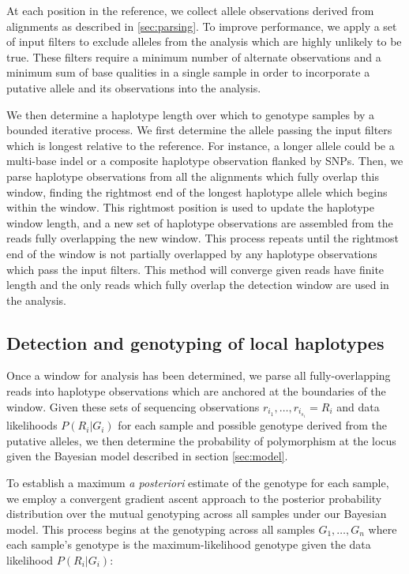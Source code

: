 \documentclass{article}
\begin{document}
At each position in the reference, we collect allele observations derived from alignments as described in \ref{sec:parsing}.  To improve performance, we apply a set of input filters to exclude alleles from the analysis which are highly unlikely to be true.  These filters require a minimum number of alternate observations and a minimum sum of base qualities in a single sample in order to incorporate a putative allele and its observations into the analysis.

We then determine a haplotype length over which to genotype samples by a bounded iterative process.  We first determine the allele passing the input filters which is longest relative to the reference.  For instance, a longer allele could be a multi-base indel or a composite haplotype observation flanked by SNPs.  Then, we parse haplotype observations from all the alignments which fully overlap this window, finding the rightmost end of the longest haplotype allele which begins within the window.  This rightmost position is used to update the haplotype window length, and a new set of haplotype observations are assembled from the reads fully overlapping the new window.  This process repeats until the rightmost end of the window is not partially overlapped by any haplotype observations which pass the input filters. This method will converge given reads have finite length and the only reads which fully overlap the detection window are used in the analysis.

\subsection{Detection and genotyping of local haplotypes}
\label{sec:genotyping}

Once a window for analysis has been determined, we parse all fully-overlapping reads into haplotype observations which are anchored at the boundaries of the window.  Given these sets of sequencing observations $r_{i_1},\ldots,r_{i_{s_i}} = R_i$ and data likelihoods $P(R_i|G_i)$ for each sample and possible genotype derived from the putative alleles, we then determine the probability of polymorphism at the locus given the Bayesian model described in section \ref{sec:model}.

To establish a maximum \emph{a posteriori} estimate of the genotype for each sample, we employ a convergent gradient ascent approach to the posterior probability distribution over the mutual genotyping across all samples under our Bayesian model.  This process begins at the genotyping across all samples $G_1,\ldots,G_n$ where each sample's genotype is the maximum-likelihood genotype given the data likelihood $P(R_i|G_i)$:
\end{document}
